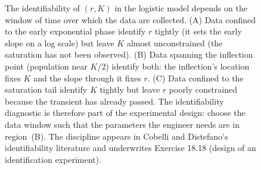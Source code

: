 \begin{figure}[htbp]
\caption[Parameter identifiability and the data window]{The
identifiability of $(r, K)$ in the logistic model depends on the
window of time over which the data are collected. (A) Data confined to
the early exponential phase identify $r$ tightly (it sets the early
slope on a log scale) but leave $K$ almost unconstrained (the
saturation has not been observed). (B) Data spanning the inflection
point (population near $K/2$) identify both: the inflection's location
fixes $K$ and the slope through it fixes $r$. (C) Data confined to
the saturation tail identify $K$ tightly but leave $r$ poorly
constrained because the transient has already passed. The identifiability
diagnostic is therefore part of the experimental design: choose the
data window such that the parameters the engineer needs are in
region~(B). The discipline appears in Cobelli and Distefano's
identifiability literature \cite{paper:v2ch18-cobelli-distefano-1980}
and underwrites Exercise 18.18 (design of an identification experiment).}
\label{fig:vol02:ch18:identifiability}
\end{figure}
